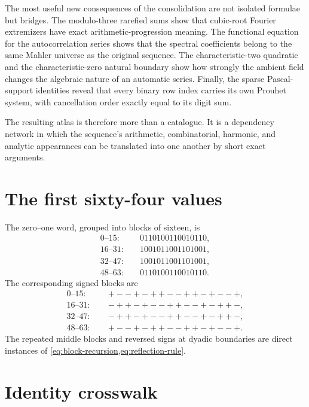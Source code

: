 \documentclass[11pt,oneside]{article}
\theoremstyle{definition}
\theoremstyle{remark}
\begin{document}
The most useful new consequences of the consolidation are not isolated
formulae but bridges.  The modulo-three rarefied sums show that cubic-root
Fourier extremizers have exact arithmetic-progression meaning.  The functional
equation for the autocorrelation series shows that the spectral coefficients
belong to the same Mahler universe as the original sequence.  The
characteristic-two quadratic and the characteristic-zero natural boundary
show how strongly the ambient field changes the algebraic nature of an
automatic series.  Finally, the sparse Pascal-support identities reveal that
every binary row index carries its own Prouhet system, with cancellation order
exactly equal to its digit sum.

The resulting atlas is therefore more than a catalogue.  It is a dependency
network in which the sequence's arithmetic, combinatorial, harmonic, and
analytic appearances can be translated into one another by short exact
arguments.

\appendix

\section{The first sixty-four values}

The zero--one word, grouped into blocks of sixteen, is
\begin{align*}
 0\text{--}15:&\quad 0110100110010110,\\
16\text{--}31:&\quad 1001011001101001,\\
32\text{--}47:&\quad 1001011001101001,\\
48\text{--}63:&\quad 0110100110010110.
\end{align*}
The corresponding signed blocks are
\begin{align*}
 0\text{--}15:&\quad +--+-++--++-+--+,\\
16\text{--}31:&\quad -++-+--++--+-++-,\\
32\text{--}47:&\quad -++-+--++--+-++-,\\
48\text{--}63:&\quad +--+-++--++-+--+.
\end{align*}
The repeated middle blocks and reversed signs at dyadic boundaries are direct
instances of \cref{eq:block-recursion,eq:reflection-rule}.

\section{Identity crosswalk}
\end{document}
